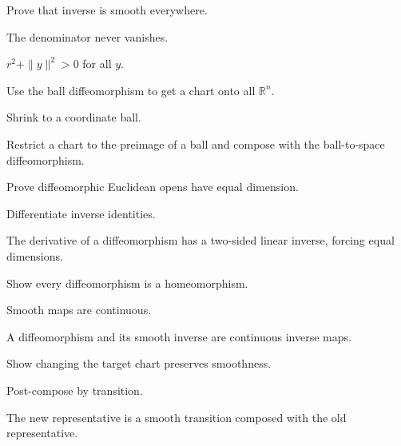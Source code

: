 \begin{exercise}\label{exr:vii03-16}
Prove that inverse is smooth everywhere.
\end{exercise}
\begin{hint}
The denominator never vanishes.
\end{hint}
\begin{solution}
\(r^2+\|y\|^2>0\) for all \(y\).
\end{solution}

\begin{exercise}\label{exr:vii03-17}
Use the ball diffeomorphism to get a chart onto all \(\mathbb R^n\).
\end{exercise}
\begin{hint}
Shrink to a coordinate ball.
\end{hint}
\begin{solution}
Restrict a chart to the preimage of a ball and compose with the ball-to-space diffeomorphism.
\end{solution}

\begin{exercise}\label{exr:vii03-18}
Prove diffeomorphic Euclidean opens have equal dimension.
\end{exercise}
\begin{hint}
Differentiate inverse identities.
\end{hint}
\begin{solution}
The derivative of a diffeomorphism has a two-sided linear inverse, forcing equal dimensions.
\end{solution}

\begin{exercise}\label{exr:vii03-19}
Show every diffeomorphism is a homeomorphism.
\end{exercise}
\begin{hint}
Smooth maps are continuous.
\end{hint}
\begin{solution}
A diffeomorphism and its smooth inverse are continuous inverse maps.
\end{solution}

\begin{exercise}\label{exr:vii03-20}
Show changing the target chart preserves smoothness.
\end{exercise}
\begin{hint}
Post-compose by transition.
\end{hint}
\begin{solution}
The new representative is a smooth transition composed with the old representative.
\end{solution}

